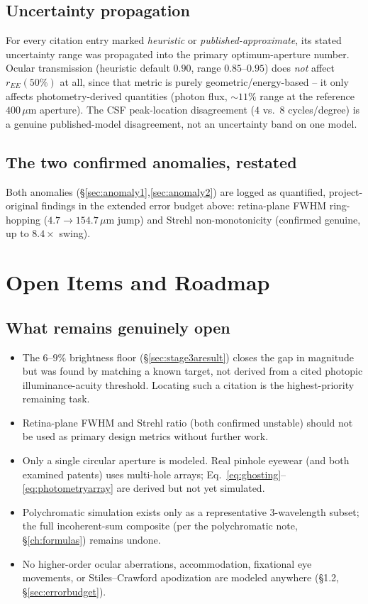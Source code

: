\documentclass[11pt]{report}
\begin{document}


\section{Uncertainty propagation}
For every citation entry marked \emph{heuristic} or \emph{published-approximate}, its stated uncertainty range was propagated into the primary optimum-aperture number. Ocular transmission (heuristic default $0.90$, range $0.85$--$0.95$) does \emph{not} affect $r_{EE}(50\%)$ at all, since that metric is purely geometric/energy-based -- it only affects photometry-derived quantities (photon flux, $\sim11\%$ range at the reference $400\,\mu$m aperture). The CSF peak-location disagreement ($4$ vs.\ $8$ cycles/degree) is a genuine published-model disagreement, not an uncertainty band on one model.

\section{The two confirmed anomalies, restated}
Both anomalies (\S\ref{sec:anomaly1},\ref{sec:anomaly2}) are logged as quantified, project-original findings in the extended error budget above: retina-plane FWHM ring-hopping ($4.7\to154.7\,\mu$m jump) and Strehl non-monotonicity (confirmed genuine, up to $8.4\times$ swing).

\chapter{Open Items and Roadmap}
\label{ch:roadmap}

\section{What remains genuinely open}
\label{sec:openitems}
\begin{itemize}[leftmargin=1.2cm]
\item The $6$--$9\%$ brightness floor (\S\ref{sec:stage3aresult}) closes the gap in magnitude but was found by matching a known target, not derived from a cited photopic illuminance-acuity threshold. Locating such a citation is the highest-priority remaining task.
\item Retina-plane FWHM and Strehl ratio (both confirmed unstable) should not be used as primary design metrics without further work.
\item Only a single circular aperture is modeled. Real pinhole eyewear (and both examined patents) uses multi-hole arrays; Eq.~\ref{eq:ghosting}--\ref{eq:photometryarray} are derived but not yet simulated.
\item Polychromatic simulation exists only as a representative 3-wavelength subset; the full incoherent-sum composite (per the polychromatic note, \S\ref{ch:formulas}) remains undone.
\item No higher-order ocular aberrations, accommodation, fixational eye movements, or Stiles--Crawford apodization are modeled anywhere (\S1.2, \S\ref{sec:errorbudget}).
\end{itemize}
\end{document}
